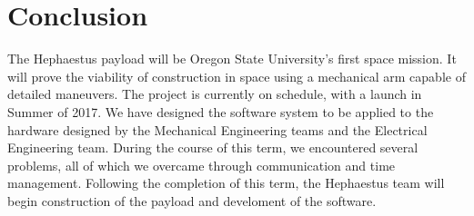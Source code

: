 \documentclass[letterpaper,10pt]{article}
\begin{document}
\section{Conclusion}
The Hephaestus \gls{payload} will be Oregon State University's first space mission. 
It will prove the viability of construction in space using a mechanical arm 
capable of detailed maneuvers. The project is currently on schedule, with a 
launch in Summer of 2017. We have designed the software system to be applied to 
the hardware designed by the Mechanical Engineering teams and the Electrical 
Engineering team. During the course of this term, we encountered several 
problems, all of which we overcame through communication and time management. 
Following the completion of this term, the Hephaestus team will begin 
construction of the \gls{payload} and develoment of the software.
\end{document}
